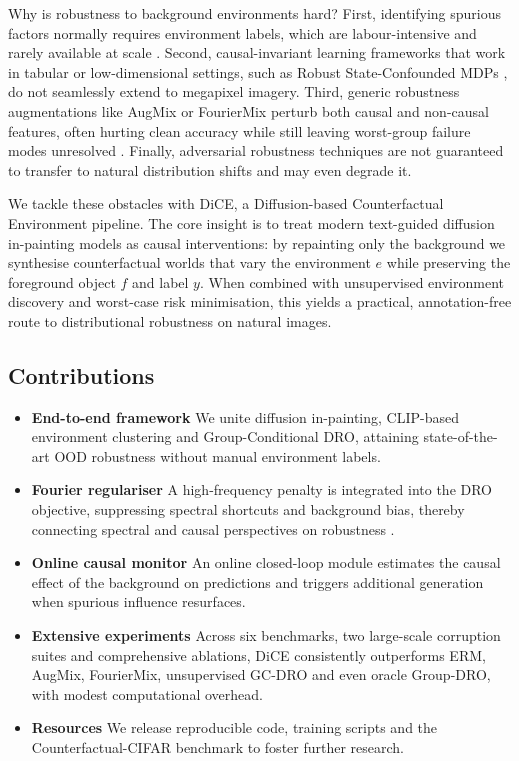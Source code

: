 \documentclass{article}
\begin{document}
Why is robustness to background environments hard? First, identifying spurious factors normally requires environment labels, which are labour-intensive and rarely available at scale \cite{gulrajani-2020-search}. Second, causal-invariant learning frameworks that work in tabular or low-dimensional settings, such as Robust State-Confounded MDPs \cite{ding-2023-seeing}, do not seamlessly extend to megapixel imagery. Third, generic robustness augmentations like AugMix or FourierMix perturb both causal and non-causal features, often hurting clean accuracy while still leaving worst-group failure modes unresolved \cite{zhou-2021-examining}. Finally, adversarial robustness techniques are not guaranteed to transfer to natural distribution shifts \cite{xu-2022-adversarially} and may even degrade it.

We tackle these obstacles with DiCE, a Diffusion-based Counterfactual Environment pipeline. The core insight is to treat modern text-guided diffusion in-painting models as causal interventions: by repainting only the background we synthesise counterfactual worlds that vary the environment $e$ while preserving the foreground object $f$ and label $y$. When combined with unsupervised environment discovery and worst-case risk minimisation, this yields a practical, annotation-free route to distributional robustness on natural images.

\subsection{Contributions}
\begin{itemize}
  \item \textbf{End-to-end framework} We unite diffusion in-painting, CLIP-based environment clustering and Group-Conditional DRO, attaining state-of-the-art OOD robustness without manual environment labels.
  \item \textbf{Fourier regulariser} A high-frequency penalty is integrated into the DRO objective, suppressing spectral shortcuts and background bias, thereby connecting spectral and causal perspectives on robustness \cite{fridovichkeil-2022-models}.
  \item \textbf{Online causal monitor} An online closed-loop module estimates the causal effect of the background on predictions and triggers additional generation when spurious influence resurfaces.
  \item \textbf{Extensive experiments} Across six benchmarks, two large-scale corruption suites and comprehensive ablations, DiCE consistently outperforms ERM, AugMix, FourierMix, unsupervised GC-DRO and even oracle Group-DRO, with modest computational overhead.
  \item \textbf{Resources} We release reproducible code, training scripts and the Counterfactual-CIFAR benchmark to foster further research.
\end{itemize}
\end{document}
